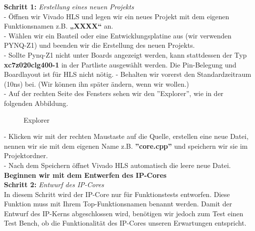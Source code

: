 \documentclass[a4paper]{report}
\begin{document}
\textbf{Schritt 1:} \textit{Erstellung eines neuen Projekts}\\
- Öffnen wir Vivado HLS und legen wir ein neues Projekt mit dem eigenen Funktionsnamen z.B. \textbf{„XXXX“} an.\\
- Wählen wir ein Bauteil oder eine Entwicklungsplatine aus (wir verwenden PYNQ-Z1) und
 beenden wir die Erstellung des neuen Projekts.\\
 - Sollte Pynq-Z1 nicht unter Boards angezeigt werden, kann stattdessen der Typ \textbf{xc7z020clg400-1} in der Partliste ausgewählt werden. Die Pin-Belegung und Boardlayout ist für HLS nicht nötig. 
- Behalten wir vorerst den Standardzeitraum (10ns) bei. (Wir können ihn später ändern, wenn wir wollen.)\\
- Auf der rechten Seite des Fensters sehen wir den ''Explorer'', wie in der folgenden Abbildung.\\
\begin{figure}[H]
\centering
{}
\caption{Explorer}
\label{fig:Explorer}
\end{figure}

- Klicken wir mit der rechten Maustaste auf die Quelle, erstellen eine neue Datei, nennen wir sie mit dem eigenen Name z.B. \textbf{''core.cpp''} und speichern wir sie im Projektordner.\\
 
- Nach dem Speichern öffnet Vivado HLS automatisch die leere neue Datei. \\

 \textbf{Beginnen wir mit dem Entwerfen des IP-Cores}\\

\textbf{Schritt 2:} \textit{Entwurf des IP-Cores}\\

In diesem Schritt wird der IP-Core nur für Funktionstests entworfen. Diese Funktion muss mit Ihrem Top-Funktionsnamen benannt werden. Damit der Entwurf des IP-Kerns abgeschlossen wird, benötigen wir jedoch zum Test einen Test Bench, ob die Funktionalität des IP-Cores unseren Erwartungen entspricht.\\
\end{document}
